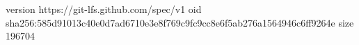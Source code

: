 version https://git-lfs.github.com/spec/v1
oid sha256:585d91013c40e0d7ad6710e3e8f769c9fc9cc8e6f5ab276a1564946c6ff9264e
size 196704

